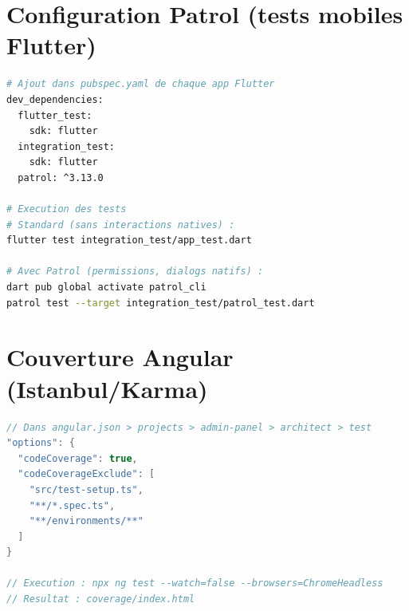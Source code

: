 \section{Configuration Patrol (tests mobiles Flutter)}

\begin{lstlisting}[language=bash, caption={Configuration Patrol dans pubspec.yaml}, label={lst:patrol}]
# Ajout dans pubspec.yaml de chaque app Flutter
dev_dependencies:
  flutter_test:
    sdk: flutter
  integration_test:
    sdk: flutter
  patrol: ^3.13.0

# Execution des tests
# Standard (sans interactions natives) :
flutter test integration_test/app_test.dart

# Avec Patrol (permissions, dialogs natifs) :
dart pub global activate patrol_cli
patrol test --target integration_test/patrol_test.dart
\end{lstlisting}

\section{Couverture Angular (Istanbul/Karma)}

\begin{lstlisting}[language=Java, caption={angular.json --- Activation de la couverture de code}, label={lst:angular-coverage}]
// Dans angular.json > projects > admin-panel > architect > test
"options": {
  "codeCoverage": true,
  "codeCoverageExclude": [
    "src/test-setup.ts",
    "**/*.spec.ts",
    "**/environments/**"
  ]
}

// Execution : npx ng test --watch=false --browsers=ChromeHeadless
// Resultat : coverage/index.html
\end{lstlisting}
